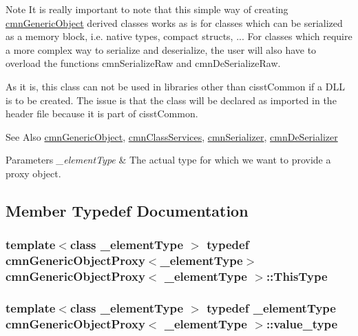 \begin{DoxyNote}{Note}
It is really important to note that this simple way of creating \hyperlink{classcmn_generic_object}{cmn\-Generic\-Object} derived classes works as is for classes which can be serialized as a memory block, i.\-e. native types, compact structs, ... For classes which require a more complex way to serialize and deserialize, the user will also have to overload the functions cmn\-Serialize\-Raw and cmn\-De\-Serialize\-Raw.

As it is, this class can not be used in libraries other than cisst\-Common if a D\-L\-L is to be created. The issue is that the class will be declared as imported in the header file because it is part of cisst\-Common.
\end{DoxyNote}
\begin{DoxySeeAlso}{See Also}
\hyperlink{classcmn_generic_object}{cmn\-Generic\-Object}, \hyperlink{classcmn_class_services}{cmn\-Class\-Services}, \hyperlink{classcmn_serializer}{cmn\-Serializer}, \hyperlink{classcmn_de_serializer}{cmn\-De\-Serializer}
\end{DoxySeeAlso}

\begin{DoxyParams}{Parameters}
{\em \-\_\-element\-Type} & The actual type for which we want to provide a proxy object. \\
\hline
\end{DoxyParams}


\subsection{Member Typedef Documentation}
\hypertarget{classcmn_generic_object_proxy_a4ad0391ca48ebfb86d6bbda89a98c99d}{
\subsubsection[{This\-Type}]{\setlength{\rightskip}{0pt plus 5cm}template$<$class \-\_\-element\-Type $>$ typedef {\bf cmn\-Generic\-Object\-Proxy}$<$\-\_\-element\-Type$>$ {\bf cmn\-Generic\-Object\-Proxy}$<$ \-\_\-element\-Type $>$\-::{\bf This\-Type}}}\label{classcmn_generic_object_proxy_a4ad0391ca48ebfb86d6bbda89a98c99d}
\hypertarget{classcmn_generic_object_proxy_a5a3db96e5acd73055d5d34c25c1635f3}{
\subsubsection[{value\-\_\-type}]{\setlength{\rightskip}{0pt plus 5cm}template$<$class \-\_\-element\-Type $>$ typedef \-\_\-element\-Type {\bf cmn\-Generic\-Object\-Proxy}$<$ \-\_\-element\-Type $>$\-::{\bf value\-\_\-type}}}\label{classcmn_generic_object_proxy_a5a3db96e5acd73055d5d34c25c1635f3}


